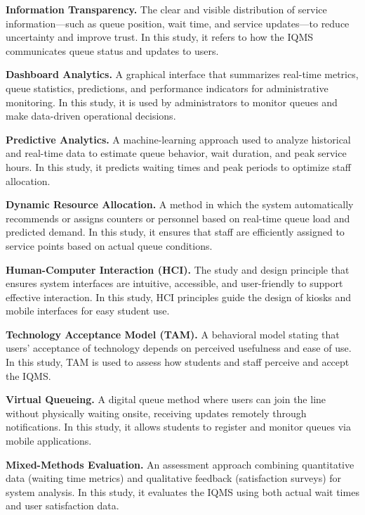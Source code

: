 \documentclass{research}
\begin{document}
\medskip
\indent\textbf{Information Transparency.} The clear and visible distribution of service information---such as queue position, wait time, and service updates---to reduce uncertainty and improve trust. In this study, it refers to how the IQMS communicates queue status and updates to users.

\medskip
\indent\textbf{Dashboard Analytics.} A graphical interface that summarizes real-time metrics, queue statistics, predictions, and performance indicators for administrative monitoring. In this study, it is used by administrators to monitor queues and make data-driven operational decisions.

\medskip
\indent\textbf{Predictive Analytics.} A machine-learning approach used to analyze historical and real-time data to estimate queue behavior, wait duration, and peak service hours. In this study, it predicts waiting times and peak periods to optimize staff allocation.

\medskip
\indent\textbf{Dynamic Resource Allocation.} A method in which the system automatically recommends or assigns counters or personnel based on real-time queue load and predicted demand. In this study, it ensures that staff are efficiently assigned to service points based on actual queue conditions.

\medskip
\indent\textbf{Human-Computer Interaction (HCI).} The study and design principle that ensures system interfaces are intuitive, accessible, and user-friendly to support effective interaction. In this study, HCI principles guide the design of kiosks and mobile interfaces for easy student use.

\medskip
\indent\textbf{Technology Acceptance Model (TAM).} A behavioral model stating that users' acceptance of technology depends on perceived usefulness and ease of use. In this study, TAM is used to assess how students and staff perceive and accept the IQMS.

\medskip
\indent\textbf{Virtual Queueing.} A digital queue method where users can join the line without physically waiting onsite, receiving updates remotely through notifications. In this study, it allows students to register and monitor queues via mobile applications.

\medskip
\indent\textbf{Mixed-Methods Evaluation.} An assessment approach combining quantitative data (waiting time metrics) and qualitative feedback (satisfaction surveys) for system analysis. In this study, it evaluates the IQMS using both actual wait times and user satisfaction data.
\end{document}
